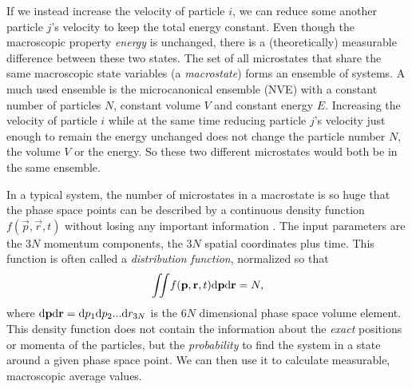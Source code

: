 If we instead increase the velocity of particle $i$, we can reduce some another particle $j$'s velocity to keep the total energy constant. Even though the macroscopic property \textit{energy} is unchanged, there is a (theoretically) measurable difference between these two states. The set of all microstates that share the same macroscopic state variables (a \textit{macrostate}) forms an ensemble of systems. A much used ensemble is the microcanonical ensemble (NVE) with a constant number of particles $N$, constant volume $V$ and constant energy $E$. Increasing the velocity of particle $i$ while at the same time reducing particle $j$'s velocity just enough to remain the energy unchanged does not change the particle number $N$, the volume $V$ or the energy. So these two different microstates would both be in the same ensemble.

In a typical system, the number of microstates in a macrostate is so huge that the phase space points can be described by a continuous density function $f(\vec p, \vec r, t)$ without losing any important information \cite{mcquarrie1973statistical}. The input parameters are the $3N$ momentum components, the $3N$ spatial coordinates plus time. This function is often called a \textit{distribution function}, normalized so that
\begin{align}
	\iint\! f(\mathbf p, \mathbf r, t) \mathrm{d}\mathbf p\mathrm{d}\mathbf r = N,
\end{align}
where $\mathrm{d}\mathbf p\mathrm{d}\mathbf r=\mathrm{d}p_1\mathrm{d}p_2...\mathrm{d}r_{3N}$ is the $6N$ dimensional phase space volume element. This density function does not contain the information about the \textit{exact} positions or momenta of the particles, but the \textit{probability} to find the system in a state around a given phase space point. We can then use it to calculate measurable, macroscopic average values. 

